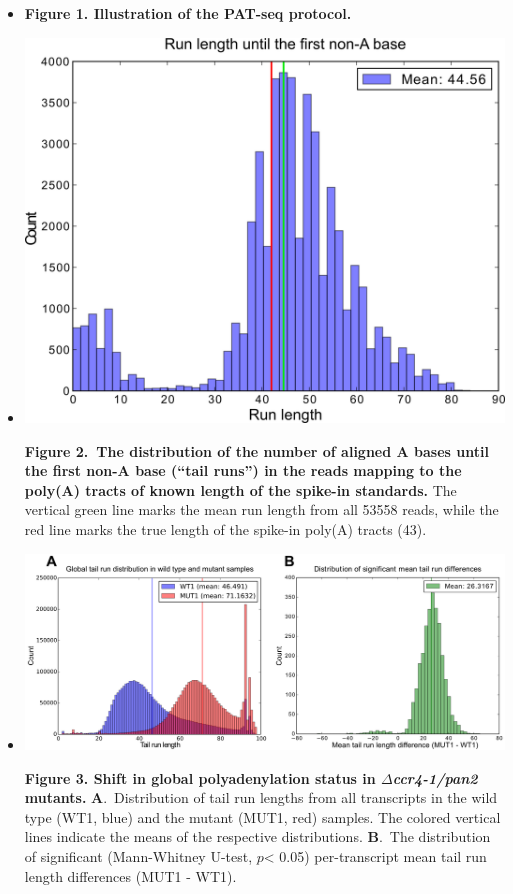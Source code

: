 \documentclass[10pt]{article}
\begin{document}
\begin{itemize}

\item[]{


\textbf{Figure 1. Illustration of the PAT-seq protocol.
}
}

\item[]{
\includegraphics[scale=0.8]{Figure2.png}

\textbf{Figure 2.~The distribution of the number of aligned A bases until the first non-A base (``tail runs'') in the reads mapping to the poly(A) tracts of known length of the spike-in standards.} The vertical green line marks the mean run length from all 53558 reads, while the red line marks the true length of the spike-in poly(A) tracts (43).}

\item[]{
\includegraphics[scale=0.8]{Figure3.png}

\textbf{Figure 3. Shift in global polyadenylation status in \textit{$\Delta$ccr4-1/pan2} mutants.} \textbf{A}.~Distribution of tail run lengths from all transcripts in the wild type (WT1, blue) and the mutant (MUT1, red) samples. The colored vertical lines indicate the means of the respective distributions.
\textbf{B}.~The distribution of significant (Mann-Whitney U-test, $p$< 0.05) per-transcript mean tail run length differences (MUT1 - WT1).
}


\end{itemize}
\end{document}
